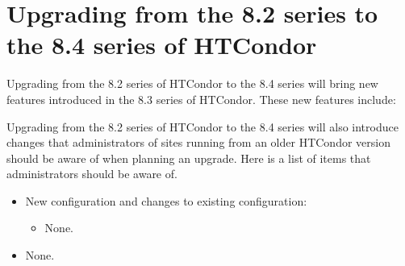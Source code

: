 \section{\label{sec:to-8.4}Upgrading from the 8.2 series to the 8.4 series of HTCondor}

Upgrading from the 8.2 series of HTCondor to the 8.4 series 
will bring new features introduced in the 8.3 series of HTCondor.
These new features include:
\MoreTodo

Upgrading from the 8.2 series of HTCondor to the 8.4 series will
also introduce changes that administrators of sites running from an older
HTCondor version should be aware of when planning an upgrade.  
Here is a list of items that administrators should be aware of.

\begin{itemize}

\item New configuration and changes to existing configuration:
  \begin{itemize}
  \item None.
  \end{itemize}

\item None.

\end{itemize}

